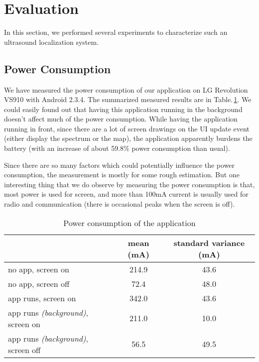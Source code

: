 \section{Evaluation}
\label{sec:evaluation}

In this section, we performed several experiments to characterize such an ultrasound localization system.

\subsection{Power Consumption}
\label{sec:power-consumption}
We have measured the power consumption of our application on LG Revolution VS910 with Android 2.3.4. The summarized measured results are in Table.\,\ref{tab:power}. We could easily found out that having this application running in the background doesn't affect much of the power consumption. While having the application running in front, since there are a lot of screen drawings on the UI update event (either display the spectrum or the map), the application apparently burdens the battery (with an increase of about 59.8\% power consumption than usual).

Since there are so many factors which could potentially influence the power consumption, the measurement is mostly for some rough estimation. But one interesting thing that we do observe by measuring the power consumption is that, most power is used for screen, and more than 100mA current is usually used for radio and communication (there is occasional peaks when the screen is off). 

\begin{table}
  \centering
  \begin{tabular}{|l|c|c|}
    \hline
    & mean (mA) & standard variance (mA) \\
    \hline
    no app, screen on &  214.9 & 43.6 \\
    no app, screen off &  72.4 & 48.0 \\
    \hline
    app runs, screen on &  342.0 & 43.6 \\
    app runs {\em (background)}, screen on & 211.0 & 10.0 \\
    app runs {\em (background)}, screen off &  56.5 & 49.5 \\
    \hline
  \end{tabular}
  \caption{Power consumption of the application}
  \label{tab:power}
\end{table}



